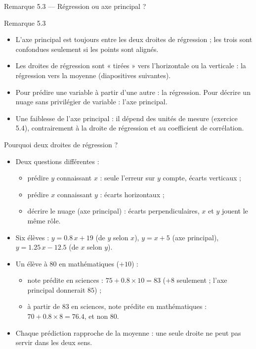 \begin{frame}{Remarque 5.3 --- Régression ou axe principal ?}
  \begin{Rem}{Remarque 5.3}
    \begin{itemize}
      \item L'axe principal est toujours entre les deux droites de
        régression ; les trois sont confondues seulement si les points sont
        alignés.
      \item Les droites de régression sont « tirées » vers l'horizontale ou
        la verticale : la régression vers la moyenne (diapositives
        suivantes).
      \item Pour prédire une variable à partir d'une autre : la régression.
        Pour décrire un nuage sans privilégier de variable : l'axe
        principal.
      \item Une faiblesse de l'axe principal : il dépend des unités de mesure
        (exercice 5.4), contrairement à la droite de régression et au
        coefficient de corrélation.
    \end{itemize}
  \end{Rem}
\end{frame}

\begin{frame}{Pourquoi deux droites de régression ?}
  \small
  \begin{itemize}
    \item Deux questions différentes :
      \begin{itemize}
        \item prédire $y$ connaissant $x$ : seule l'erreur sur $y$ compte,
          écarts verticaux ;
        \item prédire $x$ connaissant $y$ : écarts horizontaux ;
        \item décrire le nuage (axe principal) : écarts perpendiculaires,
          $x$ et $y$ jouent le même rôle.
      \end{itemize}
    \item Six élèves : $y=\num{0.8}\,x+19$ (de $y$ selon $x$), $y=x+5$
      (axe principal), $y=\num{1.25}\,x-\num{12.5}$ (de $x$ selon $y$).
    \item Un élève à $80$ en mathématiques ($+10$) :
      \begin{itemize}
        \item note prédite en sciences : $75+\num{0.8}\times10=83$ ($+8$
          seulement ; l'axe principal donnerait $85$) ;
        \item à partir de $83$ en sciences, note prédite en mathématiques :
          $70+\num{0.8}\times8=\num{76.4}$, et non $80$.
      \end{itemize}
    \item Chaque prédiction rapproche de la moyenne : une seule droite ne
      peut pas servir dans les deux sens.
  \end{itemize}
\end{frame}

